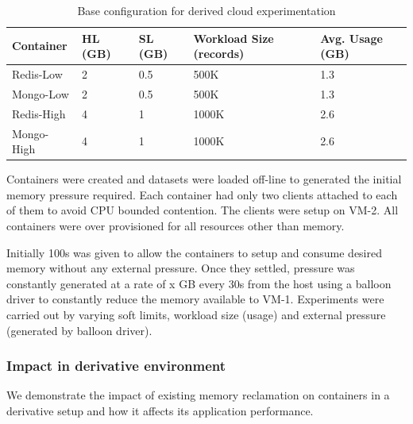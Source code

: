 	\begin{table}[!htb]
	  \begin{center}	   
	    \begin{tabular}{ l | p{2cm} | p{2cm} | p{4cm} | p{2cm} }
	      Container & HL (GB) & SL (GB) & Workload Size (records) & Avg. Usage (GB) \\ 
	      \hline
	      \hline
	      Redis-Low & 2 & 0.5 & 500K & 1.3 \\  
	      \hline
	      Mongo-Low & 2 & 0.5 & 500K & 1.3 \\
	      \hline
	      Redis-High & 4 & 1 & 1000K & 2.6 \\  
	      \hline
	      Mongo-High & 4 & 1 & 1000K & 2.6
	    \end{tabular}	  
	  \end{center}
	  \caption{Base configuration for derived cloud experimentation}
	  \label{table:default_config}	  
	\end{table}

	Containers were created and datasets were loaded off-line to generated the initial memory pressure required. Each container 
    had only two clients attached to each of them to avoid CPU bounded contention. The clients were setup on VM-2. All containers were 
    over provisioned for all resources other than memory.     
	
    	
	Initially 100s was given to allow the containers to setup and consume desired memory without any external pressure. Once they 
    settled, pressure was constantly generated at a rate of x GB every 30s from the host using a balloon driver to constantly reduce the 
    memory available to VM-1. Experiments were carried out by varying soft limits, workload size (usage) and external pressure (generated by 
    balloon driver).
    
     \subsubsection{Impact in derivative environment}
	We demonstrate the impact of existing memory reclamation on containers in a derivative setup and how it affects its application performance.
    
